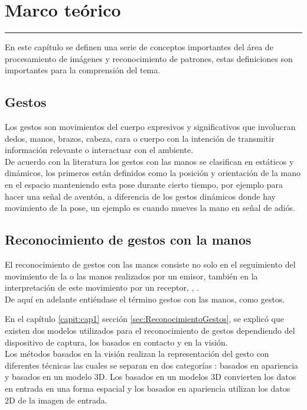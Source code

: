 \chapter{Marco te\'orico}\label{capit:cap2}
\vspace{-2.0325ex}%
\noindent
\rule{\textwidth}{0.5pt}
\vspace{-5.5ex}%
\newcommand{\pushline}{\Indp}%

En este capítulo se definen una serie de conceptos importantes del área de procesamiento de imágenes y reconocimiento de patrones, estas definiciones son importantes para la comprensión del tema.


\section{Gestos}\label{sec:2Gestos}
Los gestos \citep{Mitra2007} son movimientos del cuerpo expresivos y significativos que involucran dedos, manos, brazos, cabeza, cara o cuerpo con la intención de transmitir información relevante o interactuar con el ambiente. \\
De acuerdo con la literatura \citep{Mitra2007} los gestos con las manos se clasifican en estáticos y dinámicos, los primeros están definidos como la posición y orientación de la mano en el espacio manteniendo esta pose durante cierto tiempo, por ejemplo para hacer una se\~nal de aventón, a diferencia de los gestos dinámicos donde hay movimiento de la pose, un ejemplo  es cuando mueves la mano en se\~nal de adiós. 


\section{Reconocimiento de gestos con la manos}\label{sec:2ReconocimientoGestos}   

El reconocimiento de gestos con las manos consiste no solo en el seguimiento del movimiento de la o las manos realizados por un emisor, también en la interpretación de este movimiento por un receptor, \citep{Mitra2007}, \citep{Murthy2009}.\\
De aquí en adelante entiéndase el término gestos con las manos, como gestos.   

En el capítulo \ref{capit:cap1} sección \ref{sec:ReconocimientoGestos}, se explicó que existen dos modelos utilizados para el reconocimiento de gestos dependiendo del dispositivo de captura, los basados en contacto y en la visión.\\
Los métodos basados en la visión realizan la representación del gesto con diferentes técnicas las cuales se separan en dos categorías \citep{Rautaray2012}: basados en apariencia y basados en un modelo 3D. Los basados en un modelos 3D convierten los datos en entrada en una forma espacial y los basados en apariencia utilizan los datos 2D de la imagen de entrada.      

